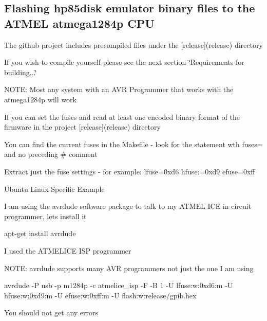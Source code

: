\subsection*{Flashing hp85disk emulator binary files to the A\+T\+M\+EL atmega1284p C\+PU}


\begin{DoxyItemize}
\item The github project includes precompiled files under the \mbox{[}release\mbox{]}(release) directory
\begin{DoxyItemize}
\item If you wish to compile yourself please see the next section \char`\"{}\+Requirements for building...\char`\"{}
\end{DoxyItemize}
\item N\+O\+TE\+: Most any system with an A\+VR Programmer that works with the atmega1284p will work
\begin{DoxyItemize}
\item If you can set the fuses and read at least one encoded binary format of the firmware in the project \mbox{[}release\mbox{]}(release) directory
\begin{DoxyItemize}
\item You can find the current fuses in the Makefile -\/ look for the statement wth fuses= and no preceding \textquotesingle{}\#\textquotesingle{} comment
\item Extract just the fuse settings -\/ for example\+: lfuse=0xd6 hfuse\+:=0xd9 efuse=0xff
\end{DoxyItemize}
\end{DoxyItemize}
\item Ubuntu Linux Specific Example
\begin{DoxyItemize}
\item I am using the avrdude software package to talk to my A\+T\+M\+EL I\+CE in circuit programmer, lets install it
\begin{DoxyItemize}
\item apt-\/get install avrdude
\end{DoxyItemize}
\item I used the A\+T\+M\+E\+L\+I\+CE I\+SP programmer
\begin{DoxyItemize}
\item N\+O\+TE\+: avrdude supports many A\+VR programmers not just the one I am using
\item avrdude -\/P usb -\/p m1284p -\/c atmelice\+\_\+isp -\/F -\/B 1 -\/U lfuse\+:w\+:0xd6\+:m -\/U hfuse\+:w\+:0xd9\+:m -\/U efuse\+:w\+:0xff\+:m -\/U flash\+:w\+:release/gpib.\+hex
\begin{DoxyItemize}
\item You should not get any errors 


\end{DoxyItemize}
\end{DoxyItemize}
\end{DoxyItemize}
\end{DoxyItemize}

